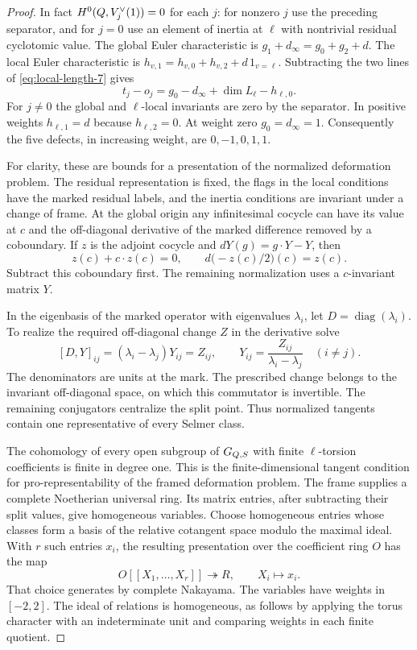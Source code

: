 \begin{proof}
In fact
\(H^0(Q,V_j^\vee(1))=0\) for each \(j\): for
nonzero \(j\) use the preceding separator, and for
\(j=0\) use an element of inertia at \(\ell\) with
nontrivial residual cyclotomic value. The global
Euler characteristic is
\(g_1+ d_\infty=g_0+g_2+d\).
The local Euler characteristic is
\(h_{v,1}=h_{v,0}+h_{v,2}+d\,1_{v=\ell}\).
Subtracting the two lines of \eqref{eq:local-length-7} gives
\[
           t_j-o_j=g_0-d_\infty+\dim L_\ell-h_{\ell,0}.
           \tag{8}\label{eq:local-length-8}
\]
For \(j\ne0\) the global and \(\ell\)-local invariants
are zero by the separator. In positive weights
\(h_{\ell,1}=d\) because \(h_{\ell,2}=0\).
At weight zero \(g_0=d_\infty=1\).
Consequently the five defects, in increasing weight,
are \(0,-1,0,1,1\).

For clarity, these are bounds for a presentation of
the normalized deformation problem. The residual
representation is fixed, the flags in the local
conditions have the marked residual labels, and the
inertia conditions are invariant under a change of
frame. At the global origin any infinitesimal
cocycle can have its value at \(c\) and the
off-diagonal derivative of the marked difference removed
by a coboundary. If \(z\) is the adjoint cocycle and
\(dY(g)=g\cdot Y-Y\), then
\[
 z(c)+c\cdot z(c)=0,\qquad d\bigl(-z(c)/2\bigr)(c)=z(c).
\]
Subtract this coboundary first. The remaining normalization
uses a \(c\)-invariant matrix \(Y\).

In the eigenbasis of the
marked operator with eigenvalues \(\lambda_i\), let \(D=\operatorname{diag}(\lambda_i)\). To realize the required off-diagonal change \(Z\) in the derivative solve
\[
 [D,Y]_{ij}=(\lambda_i-\lambda_j)Y_{ij}=Z_{ij},\qquad
 Y_{ij}=\frac{Z_{ij}}{\lambda_i-\lambda_j}\quad(i\ne j).
\]
The denominators are units at the mark. The prescribed change belongs to the invariant off-diagonal space, on which this commutator is invertible. The remaining conjugators centralize the split
point. Thus normalized tangents contain
one representative of every Selmer class.

The cohomology of every open subgroup of \(G_{Q,S}\)
with finite \(\ell\)-torsion coefficients is finite in
degree one. This is the finite-dimensional tangent
condition for pro-representability of the framed
deformation problem. The frame supplies a complete
Noetherian universal ring. Its matrix entries,
after subtracting their split values, give
homogeneous variables. Choose homogeneous entries whose classes form a basis of the relative cotangent space modulo the maximal ideal. With \(r\) such entries \(x_i\), the resulting presentation over the coefficient ring \(O\) has the map
\[
 O[[X_1,\ldots,X_r]]\twoheadrightarrow R,\qquad X_i\longmapsto x_i .
\] That choice generates by complete
Nakayama. The variables have weights in
\([-2,2]\). The ideal of relations is homogeneous,
as follows by applying the torus character with an
indeterminate unit and comparing weights in each
finite quotient.


\end{proof}
